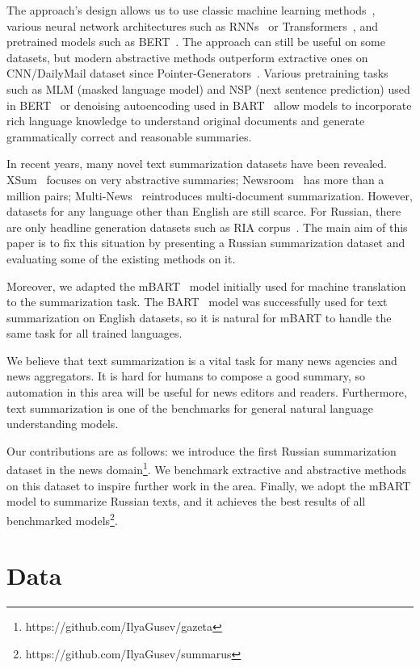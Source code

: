 \documentclass[runningheads]{llncs}
\begin{document}
The approach's design allows us to use classic machine learning methods~\cite{wong_extractive_classic_ml}, various neural network architectures such as RNNs~\cite{lstm,summarunner} or Transformers~\cite{transformers}, and pretrained models such as BERT~\cite{bert,presumm}. The approach can still be useful on some datasets, but modern abstractive methods outperform extractive ones on CNN/DailyMail dataset since Pointer-Generators~\cite{pg}. Various pretraining tasks such as MLM (masked language model) and NSP (next sentence prediction) used in BERT~\cite{bert} or denoising autoencoding used in BART~\cite{bart} allow models to incorporate rich language knowledge to understand original documents and generate grammatically correct and reasonable summaries.

In recent years, many novel text summarization datasets have been revealed. XSum~\cite{xsum} focuses on very abstractive summaries; Newsroom~\cite{newsroom} has more than a million pairs; Multi-News~\cite{multinews} reintroduces multi-document summarization. However, datasets for any language other than English are still scarce. For Russian, there are only headline generation datasets such as RIA corpus~\cite{ria}. The main aim of this paper is to fix this situation by presenting a Russian summarization dataset and evaluating some of the existing methods on it.

Moreover, we adapted the mBART~\cite{mbart} model initially used for machine translation to the summarization task. The BART~\cite{bart} model was successfully used for text summarization on English datasets, so it is natural for mBART to handle the same task for all trained languages.

We believe that text summarization is a vital task for many news agencies and news aggregators. It is hard for humans to compose a good summary, so automation in this area will be useful for news editors and readers. Furthermore, text summarization is one of the benchmarks for general natural language understanding models.

Our contributions are as follows: we introduce the first Russian summarization dataset in the news domain\footnote{https://github.com/IlyaGusev/gazeta}. We benchmark extractive and abstractive methods on this dataset to inspire further work in the area. Finally, we adopt the mBART model to summarize Russian texts, and it achieves the best results of all benchmarked models\footnote{https://github.com/IlyaGusev/summarus}.

\section{Data}
\end{document}
